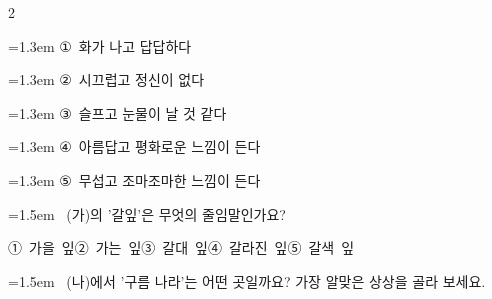 \documentclass[12pt, a4paper]{article}
\begin{document}
\begin{multicols}{2}
\begin{minipage}{\columnwidth}
\vspace{0.5mm}
{\hangindent=1.3em  \noindent\hspace{0.3em}①~화가 나고 답답하다\par}
{\hangindent=1.3em  \noindent\hspace{0.3em}②~시끄럽고 정신이 없다\par}
{\hangindent=1.3em  \noindent\hspace{0.3em}③~슬프고 눈물이 날 것 같다\par}
{\hangindent=1.3em  \noindent\hspace{0.3em}④~아름답고 평화로운 느낌이 든다\par}
{\hangindent=1.3em  \noindent\hspace{0.3em}⑤~무섭고 조마조마한 느낌이 든다\par}
\vspace{4mm}
\end{minipage}
\par

\noindent\begin{minipage}{\columnwidth}
\vspace{2mm}
{\hangindent=1.5em  ~(가)의 '갈잎'은 무엇의 줄임말인가요?\par}

\vspace{0.5mm}
\noindent
\mbox{①~가을 잎}\hspace{1em}\mbox{②~가는 잎}\hspace{1em}\mbox{③~갈대 잎}\hspace{1em}\mbox{④~갈라진 잎}\hspace{1em}\mbox{⑤~갈색 잎}

\vspace{4mm}
\end{minipage}
\par

\noindent\begin{minipage}{\columnwidth}
\vspace{2mm}
{\hangindent=1.5em  ~(나)에서 '구름 나라'는 어떤 곳일까요? 가장 알맞은 상상을 골라 보세요.\par}


\end{minipage}
\end{multicols}
\end{document}
